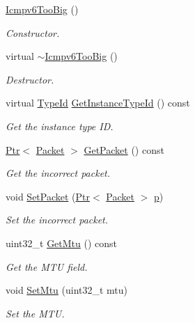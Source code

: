 \begin{DoxyCompactItemize}
\item 
\hyperlink{classns3_1_1Icmpv6TooBig_a583767b7957d51b262b872db4de55543}{Icmpv6\+Too\+Big} ()
\begin{DoxyCompactList}\small\item\em Constructor. \end{DoxyCompactList}\item 
virtual \hyperlink{classns3_1_1Icmpv6TooBig_aafe2f0ed37ceb2508442d65296e39cad}{$\sim$\+Icmpv6\+Too\+Big} ()
\begin{DoxyCompactList}\small\item\em Destructor. \end{DoxyCompactList}\item 
virtual \hyperlink{classns3_1_1TypeId}{Type\+Id} \hyperlink{classns3_1_1Icmpv6TooBig_a669f74f3c5a5ed511565a167448e7c10}{Get\+Instance\+Type\+Id} () const 
\begin{DoxyCompactList}\small\item\em Get the instance type ID. \end{DoxyCompactList}\item 
\hyperlink{classns3_1_1Ptr}{Ptr}$<$ \hyperlink{classns3_1_1Packet}{Packet} $>$ \hyperlink{classns3_1_1Icmpv6TooBig_a3cca27e9dbf778ccbfa522d0b0db6f5c}{Get\+Packet} () const 
\begin{DoxyCompactList}\small\item\em Get the incorrect packet. \end{DoxyCompactList}\item 
void \hyperlink{classns3_1_1Icmpv6TooBig_a91061e78f12eea6db08045c06864c99b}{Set\+Packet} (\hyperlink{classns3_1_1Ptr}{Ptr}$<$ \hyperlink{classns3_1_1Packet}{Packet} $>$ \hyperlink{lte__link__budget__x2__handover__measures_8m_ac9de518908a968428863f829398a4e62}{p})
\begin{DoxyCompactList}\small\item\em Set the incorrect packet. \end{DoxyCompactList}\item 
uint32\+\_\+t \hyperlink{classns3_1_1Icmpv6TooBig_a4aaa72f736210281bcce4453c3dff025}{Get\+Mtu} () const 
\begin{DoxyCompactList}\small\item\em Get the M\+TU field. \end{DoxyCompactList}\item 
void \hyperlink{classns3_1_1Icmpv6TooBig_a1f122834e53dbf5b9e3f16e85621a9f8}{Set\+Mtu} (uint32\+\_\+t mtu)
\begin{DoxyCompactList}\small\item\em Set the M\+TU. \end{DoxyCompactList}\item 

\end{DoxyCompactItemize}

